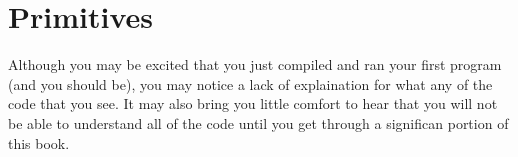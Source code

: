 


\chapter{Primitives}


Although you may be excited that you just compiled and ran your first program (and you should be), you may notice a lack of explaination for what any of the code that you see.
It may also bring you little comfort to hear that you will not be able to understand all of the code until you get through a significan portion of this book.

